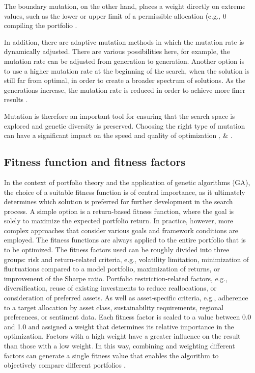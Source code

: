 \documentclass{agasthesis}
\begin{document}
The boundary mutation, on the other hand, places a weight directly on extreme values, such as the lower or upper limit of a 
permissible allocation (e.g., 0%
compiling the portfolio \cite[p. 181]{rajakumar_static_2013}.

In addition, there are adaptive mutation methods in which the mutation rate is dynamically adjusted. There are various possibilities here, 
for example, the mutation rate can be adjusted from generation to generation. Another option is to use a higher mutation rate at the beginning 
of the search, when the solution is still far from optimal, in order to create a broader spectrum of solutions. As the generations increase, 
the mutation rate is reduced in order to achieve more finer results \cite[p. 181]{rajakumar_static_2013}.

Mutation is therefore an important tool for ensuring that the search space is explored and genetic diversity is preserved. 
Choosing the right type of mutation can have a significant impact on the speed and quality of optimization \cite{rajakumar_static_2013}, \cite[p. 8 & 129-130]{melanie_introduction_1999} \& \cite[p. 471]{kalayci_review_2017}.


\subsection{Fitness function and fitness factors}
In the context of portfolio theory and the application of genetic algorithms (GA), the choice of a suitable fitness function is of central importance, 
as it ultimately determines which solution is preferred for further development in the search process. A simple option is a return-based fitness function, 
where the goal is solely to maximize the expected portfolio return. In practice, however, more complex approaches that consider various goals and framework 
conditions are employed. The fitness functions are always applied to the entire portfolio that is to be optimized. The fitness factors used can be roughly divided 
into three groups: risk and return-related criteria, e.g., volatility limitation, minimization of fluctuations compared to a model portfolio, maximization of returns, 
or improvement of the Sharpe ratio. Portfolio restriction-related factors, e.g., diversification, reuse of existing investments to reduce reallocations, or consideration 
of preferred assets. As well as asset-specific criteria, e.g., adherence to a target allocation by asset class, sustainability requirements, regional preferences, or sentiment data. 
Each fitness factor is scaled to a value between 0.0 and 1.0 and assigned a weight that determines its relative importance in the optimization. Factors with a high weight have a greater 
influence on the result than those with a low weight. In this way, combining and weighting different factors can generate a single fitness value that enables the algorithm to objectively 
compare different portfolios \cite[p. 206-207]{soldatos_big_2022}.
\end{document}
